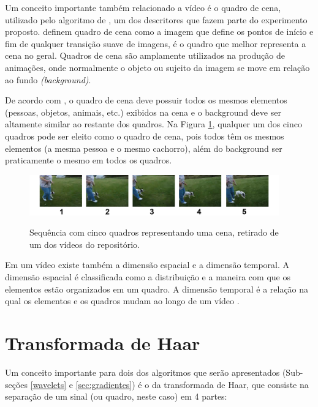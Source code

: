        Um conceito importante também relacionado a vídeo é o quadro de cena, utilizado pelo algoritmo de \citeauthor{mao2015sceneframe}, um dos descritores que fazem parte do experimento proposto. \citeauthor{7848130} definem quadro de cena como a imagem que define os pontos de início e fim de qualquer transição suave de imagens, é o quadro que melhor representa a cena no geral. Quadros de cena são amplamente utilizados na produção de animações, onde normalmente o objeto ou sujeito da imagem se move em relação ao fundo \textit{(background)}. 

	De acordo com \citeauthor{mao2015sceneframe}, o quadro de cena deve possuir todos os mesmos elementos (pessoas, objetos, animais, etc.) exibidos na cena e o background deve ser altamente similar ao restante dos quadros. Na Figura \ref{fig:quadro_cena}, qualquer um dos cinco quadros pode ser eleito como o quadro de cena, pois todos têm os mesmos elementos (a mesma pessoa e o mesmo cachorro), além do background ser praticamente o mesmo em todos os quadros.

 \begin{figure}[!htb]
      \centering
      \caption{Sequência com cinco quadros representando uma cena, retirado de um dos vídeos do repositório.}
       \includegraphics[width=0.96\textwidth]{dados/figuras/keyframe.png}
      \label{fig:quadro_cena}
    \end{figure}   
    

    
    Em um vídeo existe também a dimensão espacial e a dimensão temporal. A dimensão espacial é classificada como a distribuição e a maneira com que os elementos estão organizados em um quadro. A dimensão temporal é a relação na qual os elementos e os quadros mudam ao longo de um vídeo \citeauthor{hampapur2001comparison}.
    
\section{Transformada de Haar}

Um conceito importante para dois dos algoritmos que serão apresentados (Sub-seções  \ref{wavelets} e \ref{sec:gradientes}) é o da transformada de Haar, que consiste na separação de um sinal (ou quadro, neste caso) em 4 partes: 

